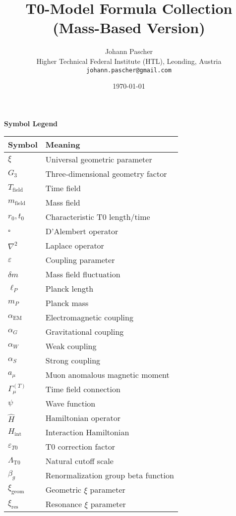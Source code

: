 \documentclass[12pt,a4paper]{article}
\title{T0-Model Formula Collection\\
	\large (Mass-Based Version)}
\author{Johann Pascher\\
	\small Higher Technical Federal Institute (HTL), Leonding, Austria\\
	\small \texttt{johann.pascher@gmail.com}}
\date{\today}
\begin{document}
	
	\maketitle
	
	\begin{center}
		\Large \textbf{Symbol Legend}
	\end{center}
	
	\begin{longtable}{|p{}|p{}|}
		\hline
		\textbf{Symbol} & \textbf{Meaning} \\
		\hline
		$\xi$ & Universal geometric parameter \\
		\hline
		$G_3$ & Three-dimensional geometry factor \\
		\hline
		$T_{\text{field}}$ & Time field \\
		\hline
		$m_{\text{field}}$ & Mass field \\
		\hline
		$r_0, t_0$ & Characteristic T0 length/time \\
		\hline
		$\square$ & D'Alembert operator \\
		\hline
		$\nabla^2$ & Laplace operator \\
		\hline
		$\varepsilon$ & Coupling parameter \\
		\hline
		$\delta m$ & Mass field fluctuation \\
		\hline
		$\ell_P$ & Planck length \\
		\hline
		$m_P$ & Planck mass \\
		\hline
		$\alpha_{\text{EM}}$ & Electromagnetic coupling \\
		\hline
		$\alpha_G$ & Gravitational coupling \\
		\hline
		$\alpha_W$ & Weak coupling \\
		\hline
		$\alpha_S$ & Strong coupling \\
		\hline
		$a_\mu$ & Muon anomalous magnetic moment \\
		\hline
		$\Gamma_\mu^{(T)}$ & Time field connection \\
		\hline
		$\psi$ & Wave function \\
		\hline
		$\hat{H}$ & Hamiltonian operator \\
		\hline
		$H_{\text{int}}$ & Interaction Hamiltonian \\
		\hline
		$\varepsilon_{T0}$ & T0 correction factor \\
		\hline
		$\Lambda_{\text{T0}}$ & Natural cutoff scale \\
		\hline
		$\beta_g$ & Renormalization group beta function \\
		\hline
		$\xi_{\text{geom}}$ & Geometric $\xi$ parameter \\
		\hline
		$\xi_{\text{res}}$ & Resonance $\xi$ parameter \\
		\hline
	\end{longtable}
	
\end{document}

